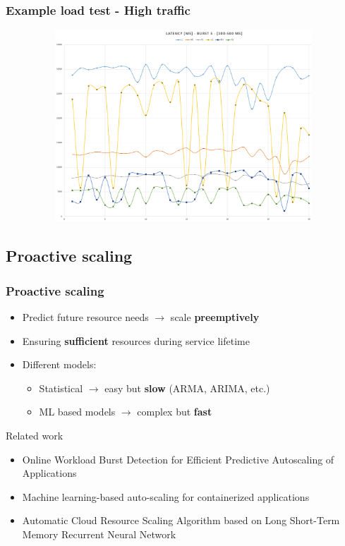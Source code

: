 \documentclass[11pt,t,usepdftitle=false,aspectratio=169]{beamer}
\begin{document}
\begin{frame}
	\frametitle{Example load test - High traffic}
	
	\begin{figure}
		\centering
		\vspace*{-0.5cm}
		\includegraphics[width=13cm,height=7.2cm]{_images/load_high.png}
	\end{figure}
\end{frame}


\subsection{Proactive scaling}
\begin{frame}
	\frametitle{{\color{uibkorange} Proactive} scaling}
	
	\begin{itemize}
		\item Predict future resource needs $\rightarrow$ scale \textbf{\color{uibkorange} preemptively}
		\item Ensuring \textbf{\color{uibkorange} sufficient} resources during service lifetime
		\item Different models:
		\begin{itemize}
			\item Statistical $\rightarrow$ easy but \textbf{\color{red} slow} (ARMA, ARIMA, etc.)
			\item ML based models $\rightarrow$ complex but \textbf{\color{uibkorange} fast}
		\end{itemize}
	\end{itemize}
	
	\smallskip
	
	\begin{block}{Related work}
		\begin{itemize}
			\item Online Workload Burst Detection for Efficient Predictive Autoscaling of Applications \cite{bib_online_workload_burst_detection}
			
			\item Machine learning-based auto-scaling for containerized applications \cite{bib_ml_scaling_containerized_applications}
			
			\item Automatic Cloud Resource Scaling Algorithm based
			on Long Short-Term Memory Recurrent Neural Network \cite{bib_cloud_resource_scaling_lstm}
		\end{itemize}
	\end{block}
\end{frame}
\end{document}
